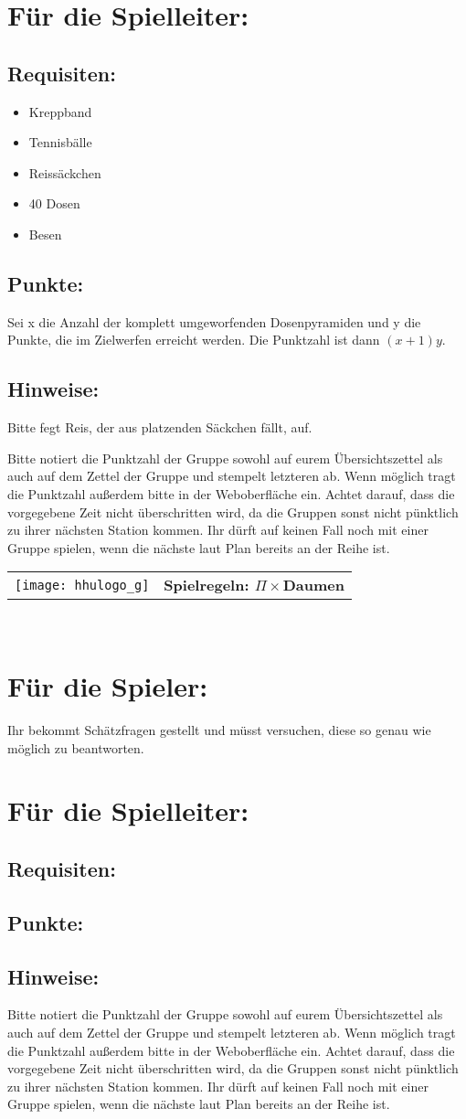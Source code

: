 \documentclass[a4paper,10pt]{article}
\def\spieli{$\Pi\times $Daumen}
\newcommand{\unten}{
 Bitte notiert die Punktzahl der Gruppe sowohl auf eurem Übersichtszettel als auch auf dem Zettel der Gruppe und stempelt letzteren ab. Wenn möglich tragt die Punktzahl außerdem bitte in der Weboberfläche ein.
 Achtet darauf, dass die vorgegebene Zeit nicht überschritten wird, da die Gruppen sonst nicht pünktlich zu ihrer nächsten Station kommen. Ihr dürft auf keinen Fall noch mit einer Gruppe spielen, wenn die nächste laut Plan bereits an der Reihe ist.
}
\begin{document}
\section*{Für die Spielleiter:}
\subsection*{Requisiten:} 
\begin{itemize}
 \item Kreppband
 \item Tennisbälle
 \item Reissäckchen
 \item 40 Dosen
 \item Besen
\end{itemize}

\subsection*{Punkte:}
Sei x die Anzahl der komplett umgeworfenden Dosenpyramiden und y die Punkte, die im Zielwerfen erreicht werden. Die Punktzahl ist dann $(x+1)y$. 
\subsection*{Hinweise:}
Bitte fegt Reis, der aus platzenden Säckchen fällt, auf.
\unten

\newpage

  \begin{tabularx}{\textwidth}{lc}
    \texttt{[image: hhulogo\_g]}
  & {\Huge \textbf{Spielregeln: \spieli}}
  \end{tabularx}\\


\Large
\section*{Für die Spieler:}
Ihr bekommt Schätzfragen gestellt und müsst versuchen, diese so genau wie möglich
zu beantworten. 

\section*{Für die Spielleiter:}
\subsection*{Requisiten:} 
\subsection*{Punkte:}
\subsection*{Hinweise:}
\unten

\newpage
\end{document}
